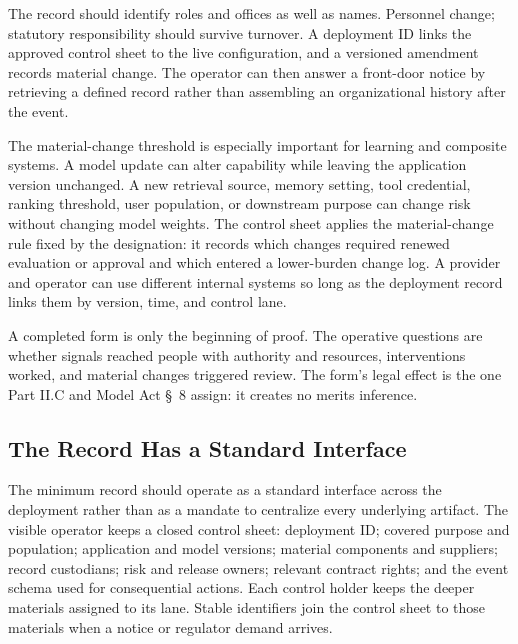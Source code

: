 The record should identify roles and offices as well as names. Personnel change; statutory responsibility should survive turnover. A deployment ID links the approved control sheet to the live configuration, and a versioned amendment records material change. The operator can then answer a front-door notice by retrieving a defined record rather than assembling an organizational history after the event.

The material-change threshold is especially important for learning and composite systems. A model update can alter capability while leaving the application version unchanged. A new retrieval source, memory setting, tool credential, ranking threshold, user population, or downstream purpose can change risk without changing model weights. The control sheet applies the material-change rule fixed by the designation: it records which changes required renewed evaluation or approval and which entered a lower-burden change log. A provider and operator can use different internal systems so long as the deployment record links them by version, time, and control lane.

A completed form is only the beginning of proof. The operative questions are whether signals reached people with authority and resources, interventions worked, and material changes triggered review. The form's legal effect is the one Part II.C and Model Act \S~8 assign: it creates no merits inference.

\subsection{The Record Has a Standard Interface}

The minimum record should operate as a standard interface across the deployment rather than as a mandate to centralize every underlying artifact. The visible operator keeps a closed control sheet: deployment ID; covered purpose and population; application and model versions; material components and suppliers; record custodians; risk and release owners; relevant contract rights; and the event schema used for consequential actions. Each control holder keeps the deeper materials assigned to its lane. Stable identifiers join the control sheet to those materials when a notice or regulator demand arrives.

